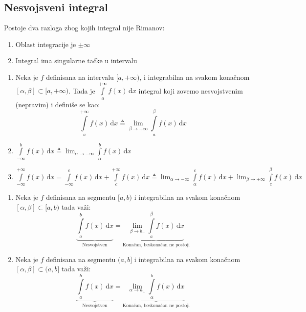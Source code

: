 \subsection{Nesvojsveni integral}
Postoje dva razloga zbog kojih integral nije Rimanov:
\begin{enumerate}[label = \arabic*.)]
	\item
		Oblast integracije je $\pm \infty$
	\item
		Integral ima singularne tačke u intervalu
\end{enumerate}
\begin{definition}
	\begin{enumerate}[label = \arabic*)]
		\item
			Neka je $f$ definisana na intervalu $[a, +\infty)$, i integrabilna na svakom konačnom $[\alpha, \beta]\subset[a,+\infty)$. Tada je $\int \limits^{+\infty}_af(x)\, \mathrm{d}x$ integral koji zovemo nesvojstvenim (nepravim) i definiše se kao:
			$$\int \limits^{+\infty}_a f(x)\, \mathrm{d}x \triangleq \lim_{\beta\to + \infty}\int\limits^\beta_a f(x)\, \mathrm{d}x$$
		\item	
			$\int \limits^b_{-\infty} f(x)\, \mathrm{d}x \triangleq \lim_{\alpha \to -\infty} \int \limits^b_\alpha f(x)\, \mathrm{d}x$
		\item
			$\int \limits^{+\infty}_{-\infty} f(x)\, \mathrm{d}x = \int \limits^c_{-\infty} f(x)\, \mathrm{d}x + \int \limits^{+\infty}_c f(x)\, \mathrm{d}x \triangleq \lim_{\alpha \to -\infty} \int \limits^c_\alpha f(x)\, \mathrm{d}x + \lim_{\beta \to +\infty} \int \limits^\beta_c f(x)\, \mathrm{d}x$
	\end{enumerate}
\end{definition}
\begin{definition}
	\begin{enumerate}[label = \alph*)]
		\item
			Neka je $f$ definisana na segmentu $[a,b)$ i integrabilna na svakom konačnom $[\alpha, \beta]\subset[a,b)$ tada važi:
			$$\underbrace{\int\limits^b_a f(x)\, \mathrm{d}x}_{\text{Nesvojstven}} = \underbrace{\lim_{\beta \to b_-} \int \limits^\beta_a f(x)\, \mathrm{d}x}_{\text{Konačan, beskonačan ne postoji}}$$
		\item
			Neka je $f$ definisana na segmentu $(a,b]$ i integrabilna na svakom konačnom $[\alpha, \beta]\subset(a,b]$ tada važi:
			$$\underbrace{\int\limits^b_a f(x)\, \mathrm{d}x}_{\text{Nesvojstven}} = \underbrace{\lim_{\alpha \to a_+} \int \limits^b_\alpha f(x)\, \mathrm{d}x}_{\text{Konačan, beskonačan ne postoji}}$$
	\end{enumerate}
\end{definition}
